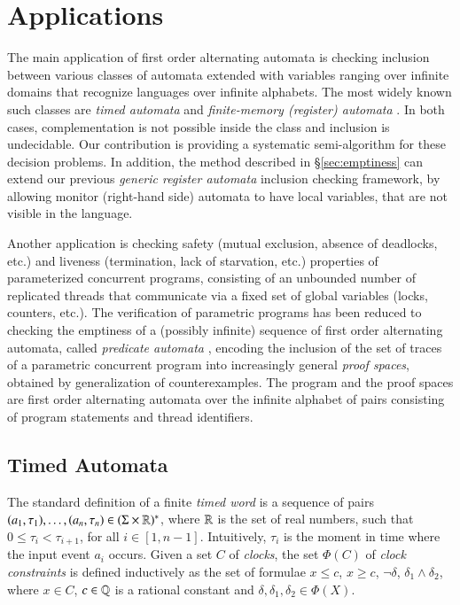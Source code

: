 \ifLongVersion
\section{Applications}
\label{sec:applications}

The main application of first order alternating automata is checking
inclusion between various classes of automata extended with variables
ranging over infinite domains that recognize languages over infinite
alphabets. The most widely known such classes are \emph{timed
  automata} \cite{AlurDill94} and \emph{finite-memory (register)
  automata} \cite{KaminskiFrancez94}. In both cases, complementation
is not possible inside the class and inclusion is undecidable. Our
contribution is providing a systematic semi-algorithm for these
decision problems. In addition, the method described in
\S\ref{sec:emptiness} can extend our previous \emph{generic register
  automata} \cite{IosifRV16} inclusion checking framework, by allowing
monitor (right-hand side) automata to have local variables, that are
not visible in the language.

Another application is checking safety (mutual exclusion, absence of
deadlocks, etc.) and liveness (termination, lack of starvation, etc.)
properties of parameterized concurrent programs, consisting of an
unbounded number of replicated threads that communicate via a fixed
set of global variables (locks, counters, etc.). The verification of
parametric programs has been reduced to checking the emptiness of a
(possibly infinite) sequence of first order alternating automata,
called \emph{predicate automata} \cite{Farzan15,Farzan16}, encoding
the inclusion of the set of traces of a parametric concurrent program
into increasingly general \emph{proof spaces}, obtained by
generalization of counterexamples. The program and the proof spaces
are first order alternating automata over the infinite alphabet of
pairs consisting of program statements and thread identifiers.

\subsection{Timed Automata}
\label{sec:ta}

The standard definition of a finite \emph{timed word} is a sequence of
pairs $(a_1,\tau_1), \ldots, (a_n,\tau_n) \in (\Sigma \times
{\bf \mathbb{R}})^*$, where ${\bf \mathbb{R}}$ is the set of real numbers, such that $0 \leq
\tau_i < \tau_{i+1}$, for all $i \in [1,n-1]$. Intuitively, $\tau_i$
is the moment in time where the input event $a_i$ occurs. Given a set
$C$ of \emph{clocks}, the set $\Phi(C)$ of \emph{clock constraints} is
defined inductively as the set of formulae $x \leq c$, $x \geq c$,
$\neg\delta$, $\delta_1 \wedge \delta_2$, where $x \in C$, $c \in
{\bf \mathbb{Q}}$ is a rational constant and $\delta,\delta_1,\delta_2 \in
\Phi(X)$. 

